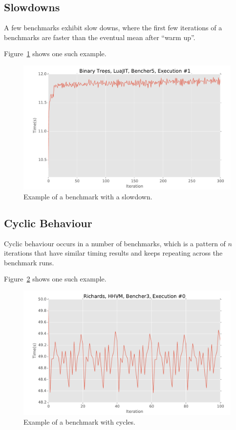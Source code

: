 \documentclass[a4paper,UKenglish]{lipics}
\begin{document}
\subsection{Slowdowns}
\label{sub:slowdowns}


A few benchmarks exhibit slow downs, where the first few iterations of a
benchmarks are faster than the eventual mean after ``warm up''.

Figure~\ref{fig:examples:slowdown1} shows one such example.

\begin{figure}[h!]
\centering
\includegraphics[width=.46\textwidth]{examples/slowdown1}
\caption{Example of a benchmark with a slowdown.}
\label{fig:examples:slowdown1}
\end{figure}



\subsection{Cyclic Behaviour}
\label{sub:cyclic}

Cyclic behaviour occurs in a number of benchmarks, which is a pattern of $n$
iterations that have similar timing results and keeps repeating across the
benchmark runs.

Figure~\ref{fig:examples:cycles1} shows one such example.

\begin{figure}[h!]
\centering
\includegraphics[width=.46\textwidth]{examples/cycles1}
\caption{Example of a benchmark with cycles.}
\label{fig:examples:cycles1}
\end{figure}
\end{document}
